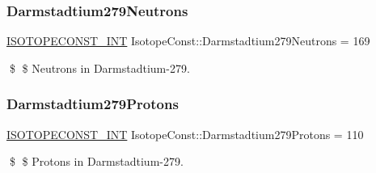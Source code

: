 \subsubsection{\texorpdfstring{Darmstadtium279\+Neutrons}{Darmstadtium279Neutrons}}
{\footnotesize\ttfamily \mbox{\hyperlink{group___isotope_const-_macros_ga5f18360b3e99483a35c32d789e62621c}{I\+S\+O\+T\+O\+P\+E\+C\+O\+N\+S\+T\+\_\+\+I\+NT}} Isotope\+Const\+::\+Darmstadtium279\+Neutrons = 169}

\$ \$ Neutrons in Darmstadtium-\/279. \mbox{\label{group___isotope_const-_darmstadtium-_ds279_gabd16a5dca438047a42619d02efefda24}} 
\subsubsection{\texorpdfstring{Darmstadtium279\+Protons}{Darmstadtium279Protons}}
{\footnotesize\ttfamily \mbox{\hyperlink{group___isotope_const-_macros_ga5f18360b3e99483a35c32d789e62621c}{I\+S\+O\+T\+O\+P\+E\+C\+O\+N\+S\+T\+\_\+\+I\+NT}} Isotope\+Const\+::\+Darmstadtium279\+Protons = 110}

\$ \$ Protons in Darmstadtium-\/279. 